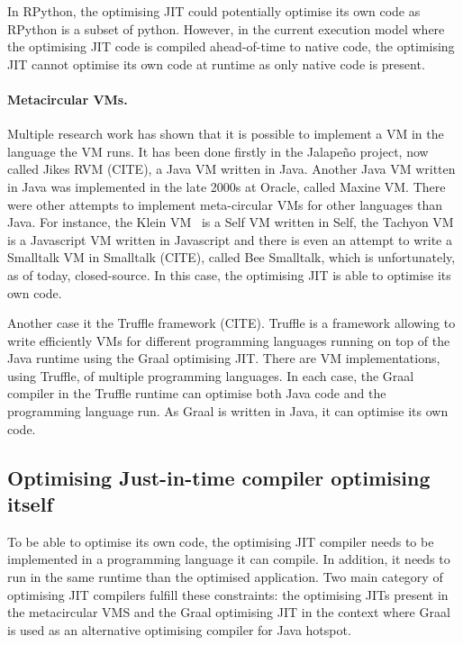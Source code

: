 \documentclass[a4paper,12pt,twoside]{../includes/ThesisStyle}
\begin{document}
In RPython, the optimising JIT could potentially optimise its own code as RPython is a subset of python. However, in the current execution model where the optimising JIT code is compiled ahead-of-time to native code, the optimising JIT cannot optimise its own code at runtime as only native code is present.

\paragraph{Metacircular VMs.}

Multiple research work has shown that it is possible to implement a VM in the language the VM runs. It has been done firstly in the Jalape\~no project, now called Jikes RVM (CITE), a Java VM written in Java. Another Java VM written in Java was implemented in the late 2000s at Oracle, called Maxine VM. There were other attempts to implement meta-circular VMs for other languages than Java. For instance, the Klein VM~\cite{Unga05b} is a Self VM written in Self, the Tachyon VM is a Javascript VM written in Javascript and there is even an attempt to write a Smalltalk VM in Smalltalk (CITE), called Bee Smalltalk, which is unfortunately, as of today, closed-source. In this case, the optimising JIT is able to optimise its own code.

Another case it the Truffle framework (CITE). Truffle is a framework allowing to write efficiently VMs for different programming languages running on top of the Java runtime using the Graal optimising JIT. There are VM implementations, using Truffle, of multiple programming languages. In each case, the Graal compiler in the Truffle runtime can optimise both Java code and the programming language run. As Graal is written in Java, it can optimise its own code.
 
\subsection{Optimising Just-in-time compiler optimising itself}

To be able to optimise its own code, the optimising JIT compiler needs to be implemented in a programming language it can compile. In addition, it needs to run in the same runtime than the optimised application. Two main category of optimising JIT compilers fulfill these constraints: the optimising JITs present in the metacircular VMS and the Graal optimising JIT in the context where Graal is used as an alternative optimising compiler for Java hotspot.
\end{document}
